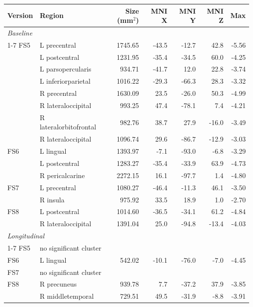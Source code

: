 \begin{tabular}{llrrrrr}
\toprule
Version & Region & Size (mm$^2$) & MNI X & MNI Y & MNI Z & Max \\
\midrule
\multicolumn{7}{l}{\textit{Baseline}} \\
\cmidrule(lr){1-7}
FS5 & L precentral & 1745.65 & -43.5 & -12.7 & 42.8 & -5.56 \\
 & L postcentral & 1231.95 & -35.4 & -34.5 & 60.0 & -4.25 \\
 & L parsopercularis & 934.71 & -41.7 & 12.0 & 22.8 & -3.74 \\
 & L inferiorparietal & 1016.22 & -29.3 & -66.3 & 28.3 & -3.32 \\
 & R precentral & 1630.09 & 23.5 & -26.0 & 50.3 & -4.99 \\
 & R lateraloccipital & 993.25 & 47.4 & -78.1 & 7.4 & -4.21 \\
 & R lateralorbitofrontal & 982.76 & 38.7 & 27.9 & -16.0 & -3.49 \\
 & R lateraloccipital & 1096.74 & 29.6 & -86.7 & -12.9 & -3.03 \\
\rowcolor{gray!12}FS6 & L lingual & 1393.97 & -7.1 & -93.0 & -6.8 & -3.29 \\
\rowcolor{gray!12} & L postcentral & 1283.27 & -35.4 & -33.9 & 63.9 & -4.73 \\
\rowcolor{gray!12} & R pericalcarine & 2272.15 & 16.1 & -97.7 & 1.4 & -4.80 \\
FS7 & L precentral & 1080.27 & -46.4 & -11.3 & 46.1 & -3.50 \\
 & R insula & 975.92 & 33.5 & 18.9 & 1.0 & -2.70 \\
\rowcolor{gray!12}FS8 & L postcentral & 1014.60 & -36.5 & -34.1 & 61.2 & -4.84 \\
\rowcolor{gray!12} & R lateraloccipital & 1391.04 & 25.0 & -94.8 & -13.4 & -4.03 \\
\multicolumn{7}{l}{\textit{Longitudinal}} \\
\cmidrule(lr){1-7}
FS5 & \multicolumn{6}{l}{no significant cluster} \\
\rowcolor{gray!12}FS6 & L lingual & 542.02 & -10.1 & -76.0 & -7.0 & -4.45 \\
FS7 & \multicolumn{6}{l}{no significant cluster} \\
\rowcolor{gray!12}FS8 & R precuneus & 939.78 & 7.7 & -37.2 & 37.9 & -3.85 \\
\rowcolor{gray!12} & R middletemporal & 729.51 & 49.5 & -31.9 & -8.8 & -3.91 \\
\bottomrule
\end{tabular}
